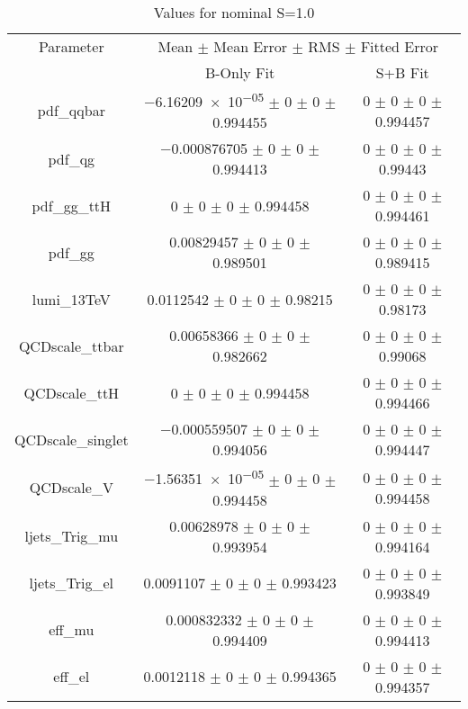 \begin{table}
\centering
\caption{Values for nominal S=1.0}
\begin{tabular}{ccc}
\toprule
Parameter & \multicolumn{2}{c}{Mean $\pm$ Mean Error $\pm$ RMS $\pm$ Fitted Error}\\
 & B-Only Fit & S+B Fit\\
\midrule
pdf\_qqbar & \num{-6.16209e-05} $\pm$ \num{0} $\pm$ \num{0} $\pm$ \num{0.994455} & \num{0} $\pm$ \num{0} $\pm$ \num{0} $\pm$ \num{0.994457}\\
pdf\_qg & \num{-0.000876705} $\pm$ \num{0} $\pm$ \num{0} $\pm$ \num{0.994413} & \num{0} $\pm$ \num{0} $\pm$ \num{0} $\pm$ \num{0.99443}\\
pdf\_gg\_ttH & \num{0} $\pm$ \num{0} $\pm$ \num{0} $\pm$ \num{0.994458} & \num{0} $\pm$ \num{0} $\pm$ \num{0} $\pm$ \num{0.994461}\\
pdf\_gg & \num{0.00829457} $\pm$ \num{0} $\pm$ \num{0} $\pm$ \num{0.989501} & \num{0} $\pm$ \num{0} $\pm$ \num{0} $\pm$ \num{0.989415}\\
lumi\_13TeV & \num{0.0112542} $\pm$ \num{0} $\pm$ \num{0} $\pm$ \num{0.98215} & \num{0} $\pm$ \num{0} $\pm$ \num{0} $\pm$ \num{0.98173}\\
QCDscale\_ttbar & \num{0.00658366} $\pm$ \num{0} $\pm$ \num{0} $\pm$ \num{0.982662} & \num{0} $\pm$ \num{0} $\pm$ \num{0} $\pm$ \num{0.99068}\\
QCDscale\_ttH & \num{0} $\pm$ \num{0} $\pm$ \num{0} $\pm$ \num{0.994458} & \num{0} $\pm$ \num{0} $\pm$ \num{0} $\pm$ \num{0.994466}\\
QCDscale\_singlet & \num{-0.000559507} $\pm$ \num{0} $\pm$ \num{0} $\pm$ \num{0.994056} & \num{0} $\pm$ \num{0} $\pm$ \num{0} $\pm$ \num{0.994447}\\
QCDscale\_V & \num{-1.56351e-05} $\pm$ \num{0} $\pm$ \num{0} $\pm$ \num{0.994458} & \num{0} $\pm$ \num{0} $\pm$ \num{0} $\pm$ \num{0.994458}\\
ljets\_Trig\_mu & \num{0.00628978} $\pm$ \num{0} $\pm$ \num{0} $\pm$ \num{0.993954} & \num{0} $\pm$ \num{0} $\pm$ \num{0} $\pm$ \num{0.994164}\\
ljets\_Trig\_el & \num{0.0091107} $\pm$ \num{0} $\pm$ \num{0} $\pm$ \num{0.993423} & \num{0} $\pm$ \num{0} $\pm$ \num{0} $\pm$ \num{0.993849}\\
eff\_mu & \num{0.000832332} $\pm$ \num{0} $\pm$ \num{0} $\pm$ \num{0.994409} & \num{0} $\pm$ \num{0} $\pm$ \num{0} $\pm$ \num{0.994413}\\
eff\_el & \num{0.0012118} $\pm$ \num{0} $\pm$ \num{0} $\pm$ \num{0.994365} & \num{0} $\pm$ \num{0} $\pm$ \num{0} $\pm$ \num{0.994357}\\

\end{tabular}
\end{table}
